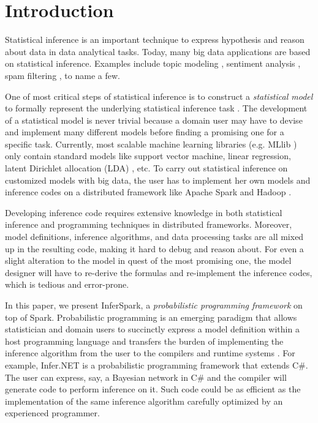 
\section{Introduction}
\label{sec:intro}


Statistical inference is an important technique to express hypothesis and
reason about data in data analytical tasks.  
Today, many big data applications are based on
statistical inference.
Examples include topic modeling \cite{blei2003latent,Titov2008a},
sentiment analysis \cite{Titov2008b, Jo2011,tsm}, spam filtering \cite{spam}, to name a few.


One of most critical steps of statistical inference is to construct a
\emph{statistical model} to formally represent the underlying statistical
inference task \cite{cox}.  The development of a statistical
model is never trivial because a domain user may have to devise and
implement many  different models before finding a promising one for a specific
task.  Currently, most scalable machine learning libraries (e.g. MLlib \cite{mllib}) only
contain standard models like support vector machine, linear regression, latent
Dirichlet allocation (LDA) \cite{blei2003latent}, etc.  
To carry out statistical inference on
customized models with big data, the user has to implement her own models and
inference codes on a distributed framework like Apache Spark
\cite{Zaharia:2010:SCC:1863103.1863113} and Hadoop \cite{hadoop}.

Developing inference code requires extensive knowledge in both statistical
inference and programming techniques in distributed frameworks.  Moreover,
model definitions, inference algorithms, and data processing tasks are all
mixed up in the resulting code, making it hard to debug and reason about.  For
even a slight alteration to the model in quest of the most promising one, the
model designer will have to re-derive the formulas and re-implement the
inference codes, which is tedious and error-prone. 

In this paper, we present InferSpark, a \emph{probabilistic programming
framework} on top of Spark.  Probabilistic programming is an emerging
paradigm that allows statistician and domain users to succinctly express a model
definition within a host programming language and transfers the burden of
implementing the inference algorithm from the user to the compilers and
runtime systems \cite{pp}.  For example, Infer.NET \cite{InferNET14} is a
probabilistic programming framework that extends C\#.  The user can express,
say, a Bayesian network in C\# and the compiler will generate code to perform
inference on it. Such code could be as efficient as the implementation of
the same inference algorithm carefully optimized by
an experienced programmer.

